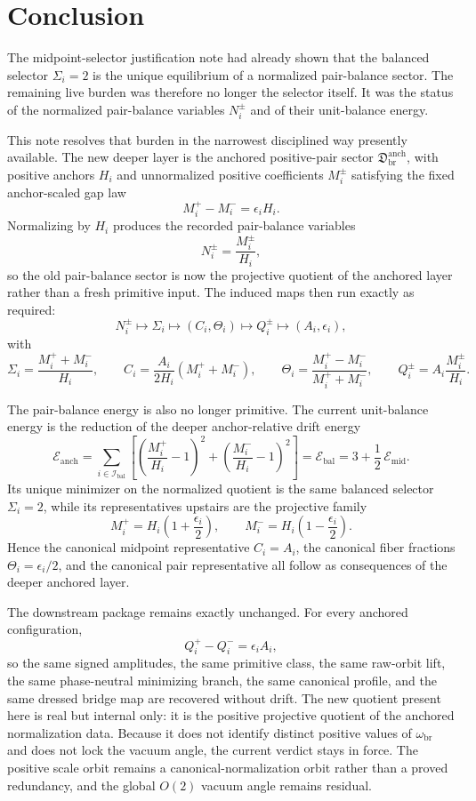 \documentclass[11pt]{article}
\newcommand{\AbsScaleAmp}{\omega_{\mathrm{br}}}
\newcommand{\SelEnergy}{\mathscr E_{\mathrm{mid}}}
\newcommand{\BalEnergy}{\mathscr E_{\mathrm{bal}}}
\newcommand{\BalOriginSector}{\mathfrak D_{\mathrm{br}}^{\mathrm{anch}}}
\newcommand{\AnchEnergy}{\mathscr E_{\mathrm{anch}}}
\newcommand{\BalIndex}{\mathcal I_{\mathrm{bal}}}
\begin{document}
\section{Conclusion}

The midpoint-selector justification note had already shown that the balanced selector \(\Sigma_i=2\) is the unique equilibrium of a normalized pair-balance sector. The remaining live burden was therefore no longer the selector itself. It was the status of the normalized pair-balance variables \(N_i^\pm\) and of their unit-balance energy.

This note resolves that burden in the narrowest disciplined way presently available. The new deeper layer is the anchored positive-pair sector \(\BalOriginSector\), with positive anchors \(H_i\) and unnormalized positive coefficients \(M_i^\pm\) satisfying the fixed anchor-scaled gap law
\[
M_i^+-M_i^-=\epsilon_i H_i.
\]
Normalizing by \(H_i\) produces the recorded pair-balance variables
\[
N_i^\pm=\frac{M_i^\pm}{H_i},
\]
so the old pair-balance sector is now the projective quotient of the anchored layer rather than a fresh primitive input. The induced maps then run exactly as required:
\[
N_i^\pm
\longmapsto
\Sigma_i
\longmapsto
(C_i,\Theta_i)
\longmapsto
Q_i^\pm
\longmapsto
(A_i,\epsilon_i),
\]
with
\[
\Sigma_i=\frac{M_i^++M_i^-}{H_i},
\qquad
C_i=\frac{A_i}{2H_i}(M_i^++M_i^-),
\qquad
\Theta_i=\frac{M_i^+-M_i^-}{M_i^++M_i^-},
\qquad
Q_i^\pm=A_i\frac{M_i^\pm}{H_i}.
\]

The pair-balance energy is also no longer primitive. The current unit-balance energy is the reduction of the deeper anchor-relative drift energy
\[
\AnchEnergy
=
\sum_{i\in\BalIndex}
\left[
\left(\frac{M_i^+}{H_i}-1\right)^2
+
\left(\frac{M_i^-}{H_i}-1\right)^2
\right]
=
\BalEnergy
=
3+\frac12\,\SelEnergy.
\]
Its unique minimizer on the normalized quotient is the same balanced selector \(\Sigma_i=2\), while its representatives upstairs are the projective family
\[
M_i^+=H_i\left(1+\frac{\epsilon_i}{2}\right),
\qquad
M_i^-=H_i\left(1-\frac{\epsilon_i}{2}\right).
\]
Hence the canonical midpoint representative \(C_i=A_i\), the canonical fiber fractions \(\Theta_i=\epsilon_i/2\), and the canonical pair representative all follow as consequences of the deeper anchored layer.

The downstream package remains exactly unchanged. For every anchored configuration,
\[
Q_i^+-Q_i^-=\epsilon_i A_i,
\]
so the same signed amplitudes, the same primitive class, the same raw-orbit lift, the same phase-neutral minimizing branch, the same canonical profile, and the same dressed bridge map are recovered without drift. The new quotient present here is real but internal only: it is the positive projective quotient of the anchored normalization data. Because it does not identify distinct positive values of \(\AbsScaleAmp\) and does not lock the vacuum angle, the current verdict stays in force. The positive scale orbit remains a canonical-normalization orbit rather than a proved redundancy, and the global \(O(2)\) vacuum angle remains residual.
\end{document}
